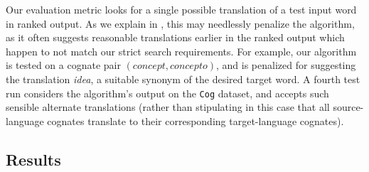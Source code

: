 \documentclass[11pt]{article}
\begin{document}
\begin{table*}[htb!]
  \centering
  \caption{Examples of common error patterns observed in the algorithm's output for
    the  environment}
  \label{tbl:errors}
\end{table*}

Our evaluation metric looks for a single possible translation of a test input
word in ranked output. As we explain in , this may
needlessly penalize the algorithm, as it often suggests reasonable translations
earlier in the ranked output which happen to not match our strict search
requirements. For example, our algorithm is tested on a cognate pair
$(\textit{concept}, \textit{concepto})$, and is penalized for suggesting the
translation \textit{idea}, a suitable synonym of the desired target word. A
fourth test run  considers the algorithm's output on the \texttt{Cog}
dataset, and accepts such sensible alternate translations (rather than
stipulating in this case that all source-language cognates translate to their
corresponding target-language cognates).

\subsection{Results}
\label{subsec:results}
\end{document}
